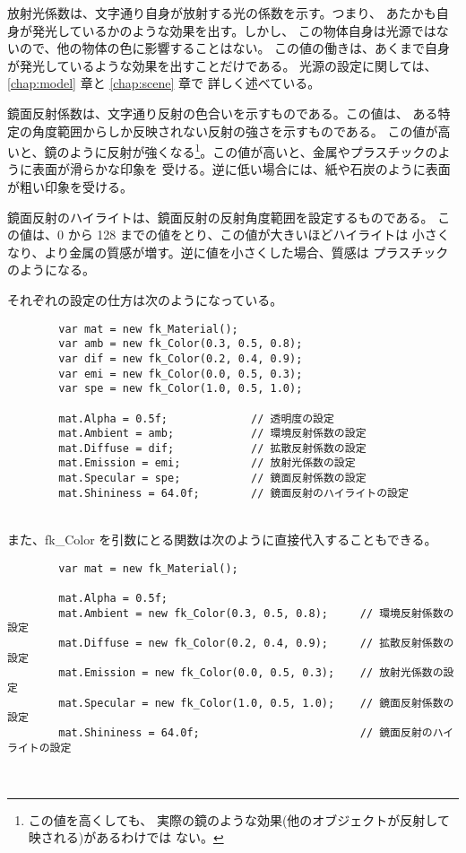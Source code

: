 放射光係数は、文字通り自身が放射する光の係数を示す。つまり、
あたかも自身が発光しているかのような効果を出す。しかし、
この物体自身は光源ではないので、他の物体の色に影響することはない。
この値の働きは、あくまで自身が発光しているような効果を出すことだけである。
光源の設定に関しては、\ref{chap:model} 章と \ref{chap:scene} 章で
詳しく述べている。

鏡面反射係数は、文字通り反射の色合いを示すものである。この値は、
ある特定の角度範囲からしか反映されない反射の強さを示すものである。
この値が高いと、鏡のように反射が強くなる\footnote{この値を高くしても、
実際の鏡のような効果(他のオブジェクトが反射して映される)があるわけでは
ない。}。この値が高いと、金属やプラスチックのように表面が滑らかな印象を
受ける。逆に低い場合には、紙や石炭のように表面が粗い印象を受ける。

鏡面反射のハイライトは、鏡面反射の反射角度範囲を設定するものである。
この値は、0 から 128 までの値をとり、この値が大きいほどハイライトは
小さくなり、より金属の質感が増す。逆に値を小さくした場合、質感は
プラスチックのようになる。

それぞれの設定の仕方は次のようになっている。
\\
\begin{breakbox}
\begin{verbatim}
        var mat = new fk_Material();
        var amb = new fk_Color(0.3, 0.5, 0.8);
        var dif = new fk_Color(0.2, 0.4, 0.9);
        var emi = new fk_Color(0.0, 0.5, 0.3);
        var spe = new fk_Color(1.0, 0.5, 1.0);

        mat.Alpha = 0.5f;             // 透明度の設定
        mat.Ambient = amb;            // 環境反射係数の設定
        mat.Diffuse = dif;            // 拡散反射係数の設定
        mat.Emission = emi;           // 放射光係数の設定
        mat.Specular = spe;           // 鏡面反射係数の設定
        mat.Shininess = 64.0f;        // 鏡面反射のハイライトの設定
\end{verbatim}
\end{breakbox}
~ \\
また、fk\_Color を引数にとる関数は次のように直接代入することもできる。
\\
\begin{breakbox}
\begin{verbatim}
        var mat = new fk_Material();

        mat.Alpha = 0.5f;
        mat.Ambient = new fk_Color(0.3, 0.5, 0.8);     // 環境反射係数の設定
        mat.Diffuse = new fk_Color(0.2, 0.4, 0.9);     // 拡散反射係数の設定
        mat.Emission = new fk_Color(0.0, 0.5, 0.3);    // 放射光係数の設定
        mat.Specular = new fk_Color(1.0, 0.5, 1.0);    // 鏡面反射係数の設定
        mat.Shininess = 64.0f;                         // 鏡面反射のハイライトの設定
\end{verbatim}
\end{breakbox}
~

